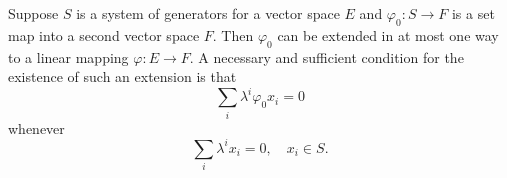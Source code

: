 Suppose $S$ is a system of generators for a vector space $E$ and $\varphi_0: S \rightarrow F$ is a set map into a second vector space $F$. Then $\varphi_0$ can be extended in at most one way to a linear mapping $\varphi: E \rightarrow F$. A necessary and sufficient condition for the existence of such an extension is that
$$
\sum_i \lambda^i \varphi_0 x_i = 0
$$
whenever
$$
\sum_i \lambda^i x_i = 0, \quad x_i \in S.
$$
